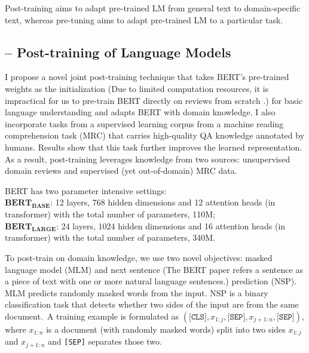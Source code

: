 Post-training aims to adapt pre-trained LM from general text to domain-specific text, whereas pre-tuning aims to adapt pre-trained LM to a particular task.

\subsection{-- Post-training of Language Models}
\label{chap4:sec:post-training}

I propose a novel joint post-training technique that takes BERT's pre-trained weights as the initialization (Due to limited computation resources, it is impractical for us to pre-train BERT directly on reviews from scratch \cite{devlin2018bert}.) for basic language understanding and adapts BERT with domain knowledge.
I also incorporate tasks from a supervised learning corpus from a machine reading comprehension task (MRC) that carries high-quality QA knowledge annotated by humans.
Results show that this task further improves the learned representation.
As a result, post-training leverages knowledge from two sources: unsupervised domain reviews and supervised (yet out-of-domain) MRC data.

BERT has two parameter intensive settings:\\
\noindent
$\textbf{BERT}_\textbf{BASE}$: 12 layers, 768 hidden dimensions and 12 attention heads (in transformer) with the total number of parameters, 110M;\\
\noindent
$\textbf{BERT}_\textbf{LARGE}$: 24 layers, 1024 hidden dimensions and 16 attention heads (in transformer) with the total number of parameters, 340M.


To post-train on domain knowledge, we use two novel objectives: masked language model (MLM) and next sentence (The BERT paper refers a sentence as a piece of text with one or more natural language sentences.) prediction (NSP). MLM predicts randomly masked words from the input.
NSP is a binary classification task that detects whether two sides of the input are from the same document.~A training example is formulated as $(\texttt{[CLS]}, x_{1:j}, \texttt{[SEP]}, x_{j+1:n}, \texttt{[SEP]})$, where $x_{1:n}$ is a document (with randomly masked words) split into two sides $x_{1:j}$ and $x_{j+1:n}$ and \texttt{[SEP]} separates those two.


